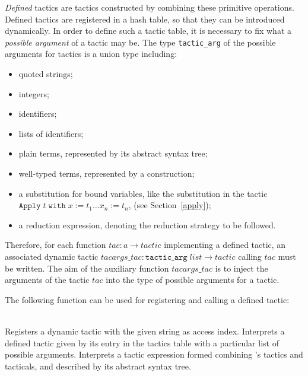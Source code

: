 \textsl{Defined} tactics are tactics constructed by combining these
primitive operations.  Defined tactics are registered in a hash table,
so that they can be introduced dynamically. In order to define such a
tactic table, it is necessary to fix what a \textsl{possible argument}
of a tactic may be. The type \texttt{tactic\_arg} of the possible
arguments for tactics is a union type including:
\begin{itemize}
\item quoted strings;
\item integers;
\item identifiers;
\item lists of identifiers;
\item plain terms, represented by its abstract syntax tree;
\item well-typed terms, represented by a construction;
\item a substitution for bound variables, like the
substitution in the tactic \\$\texttt{Apply}\;t\;\texttt{with}\;x:=t_1\ldots
x_n:=t_n$, (see Section~\ref{apply});
\item a reduction expression, denoting the reduction strategy to be
followed.
\end{itemize}
Therefore, for each function $tac:a \rightarrow tactic$ implementing a
defined tactic, an associated dynamic tactic $tacargs\_tac:
\texttt{tactic\_arg}\;list \rightarrow tactic$ calling $tac$ must be
written. The aim of the auxiliary function $tacargs\_tac$ is to inject
the arguments of the tactic $tac$ into the type of possible arguments
for a tactic.

The following function can be used for registering and calling a
defined tactic:

\begin{description}
    {\\ Registers a dynamic tactic with the given string as access index.}
    {Interprets a defined tactic given by its entry in the
     tactics table with a particular list of possible arguments.}
    {Interprets a tactic expression formed combining \Coq's tactics and
          tacticals, and described by its abstract syntax tree.}
\end{description}

